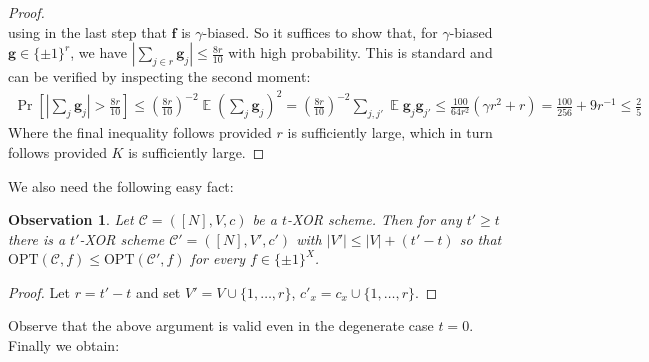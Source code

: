 \documentclass[11pt]{article}
\newtheorem{observation}{Observation}
\newcommand{\E}{\mathop{\mathbb{E}}}
\newcommand{\Opt}{\mathrm{OPT}}
\newcommand{\N}{[N]}
\begin{document}
\begin{proof}
\[\]
using in the last step that $\bm{f}$ is $\gamma$-biased. So it suffices to show that, for $\gamma$-biased $\bm{g} \in \{\pm 1\}^r$, we have $|\sum_{j \in r} \bm{g}_j| \leq \frac{8r}{10}$ with high probability. This is standard and can be verified by inspecting the second moment:
\begin{gather*}
\Pr[|\sum_j \bm{g}_j| > \frac{8r}{10}] \leq  (\frac{8r}{10})^{-2}\E (\sum_j \bm{g}_j)^2 =  (\frac{8r}{10})^{-2}\sum_{j,j'}\E \bm{g}_j \bm{g}_{j'} 
\leq \frac{100}{64r^2}(\gamma r^2  + r) = \frac{100}{256} + 9r^{-1} \leq \frac{2}{5}
\end{gather*}
Where the final inequality follows provided $r$ is sufficiently large, which in turn follows provided $K$ is sufficiently large.
\end{proof}
We also need the following easy fact:
\begin{observation}\label{obs:csp-padding}
Let $\mathcal{C} = (\N,V,c)$ be a $t$-XOR scheme. Then for any $t' \geq t$ there is a $t'$-XOR scheme $\mathcal{C'}=(\N,V',c')$ with $|V'| \leq |V|+ (t'-t)$ so that $\Opt(\mathcal{C},f) \leq \Opt(\mathcal{C'},f)$ for every $f \in \{\pm 1\}^X$.
\end{observation}
\begin{proof}
Let $r = t'-t$ and set $V' = V \cup \{1,\ldots,r\}$, $c'_x = c_x \cup \{1,\ldots,r\}$.
\end{proof}
Observe that the above argument is valid even in the degenerate case $t = 0$. Finally we obtain:
\end{document}
